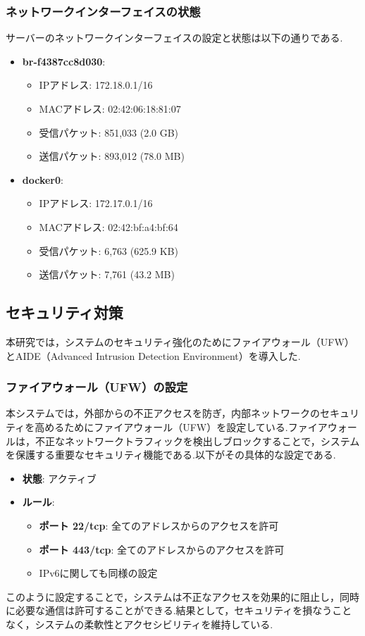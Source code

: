 \documentclass[b5paper,12pt,dvipdfmx]{jsreport}
\begin{document}
\subsubsection{ネットワークインターフェイスの状態}
サーバーのネットワークインターフェイスの設定と状態は以下の通りである.
\begin{itemize}
    \item \textbf{br-f4387cc8d030}:
    \begin{itemize}
        \item IPアドレス: 172.18.0.1/16
        \item MACアドレス: 02:42:06:18:81:07
        \item 受信パケット: 851,033 (2.0 GB)
        \item 送信パケット: 893,012 (78.0 MB)
    \end{itemize}

    \item \textbf{docker0}:
    \begin{itemize}
        \item IPアドレス: 172.17.0.1/16
        \item MACアドレス: 02:42:bf:a4:bf:64
        \item 受信パケット: 6,763 (625.9 KB)
        \item 送信パケット: 7,761 (43.2 MB)
    \end{itemize}
\end{itemize}


\subsection{セキュリティ対策}

本研究では，システムのセキュリティ強化のためにファイアウォール（UFW）とAIDE（Advanced Intrusion Detection Environment）を導入した.


\subsubsection{ファイアウォール（UFW）の設定}
本システムでは，外部からの不正アクセスを防ぎ，内部ネットワークのセキュリティを高めるためにファイアウォール（UFW）を設定している.ファイアウォールは，不正なネットワークトラフィックを検出しブロックすることで，システムを保護する重要なセキュリティ機能である.以下がその具体的な設定である.

\begin{itemize}
    \item \textbf{状態}: アクティブ
    \item \textbf{ルール}:
    \begin{itemize}
        \item \textbf{ポート 22/tcp}: 全てのアドレスからのアクセスを許可
        \item \textbf{ポート 443/tcp}: 全てのアドレスからのアクセスを許可
        \item IPv6に関しても同様の設定
    \end{itemize}
\end{itemize}
このように設定することで，システムは不正なアクセスを効果的に阻止し，同時に必要な通信は許可することができる.結果として，セキュリティを損なうことなく，システムの柔軟性とアクセシビリティを維持している.
\end{document}
